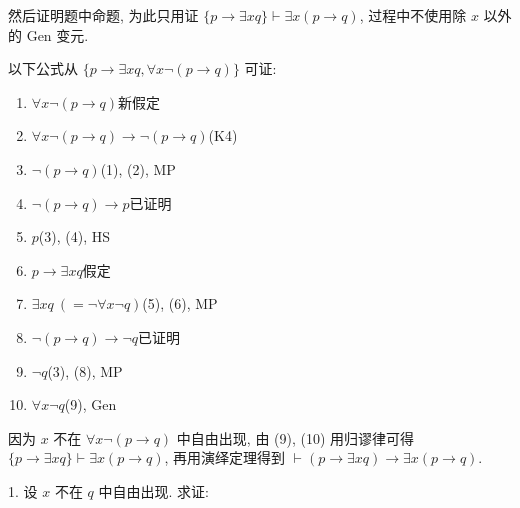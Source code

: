 \documentclass[boxes]{homework}
\begin{document}
\begin{solution}
    然后证明题中命题, 为此只用证 $\{p\to\exists xq\}\vdash\exists x(p\to q)$, 过程中不使用除 $x$ 以外的 Gen 变元.

    以下公式从 $\{p\to\exists xq, \forall x\lnot(p\to q)\}$ 可证:
    \begin{enumerate}[label = (\arabic*), itemsep = 0em, topsep = .5em, partopsep = .5em]
        \item $\forall x\lnot (p\to q)$\hfill 新假定
        \item $\forall x\lnot (p\to q)\to \lnot(p\to q)$\hfill (K4)
        \item $\lnot (p\to q)$\hfill (1), (2), MP
        \item $\lnot (p\to q)\to p$\hfill 已证明
        \item $p$\hfill (3), (4), HS
        \item $p\to \exists xq$\hfill 假定
        \item $\exists xq\ (=\lnot \forall x\lnot q)$\hfill (5), (6), MP
        \item $\lnot (p\to q)\to \lnot q$\hfill 已证明
        \item $\lnot q$\hfill (3), (8), MP
        \item $\forall x\lnot q$\hfill (9), Gen
    \end{enumerate}
    因为 $x$ 不在 $\forall x\lnot (p\to q)$ 中自由出现, 由 (9), (10) 用归谬律可得 $\{p\to \exists xq\}\vdash \exists x(p\to q)$, 再用演绎定理得到 $\vdash (p\to \exists xq)\to \exists x(p\to q)$.
\end{solution}
\begin{problem}
1. 设 $x$ 不在 $q$ 中自由出现. 求证:
\end{problem}
\end{document}
